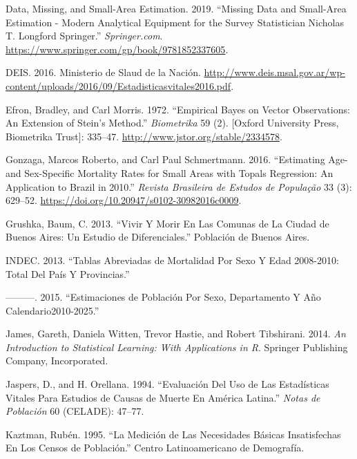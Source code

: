 \documentclass[12pt,]{article}
\begin{document}
\leavevmode\hypertarget{ref-Longford2005}{}%
Data, Missing, and Small-Area Estimation. 2019. ``Missing Data and
Small-Area Estimation - Modern Analytical Equipment for the Survey
Statistician \textbar{} Nicholas T. Longford \textbar{} Springer.''
\emph{Springer.com}.
\url{https://www.springer.com/gp/book/9781852337605}.

\leavevmode\hypertarget{ref-DEIS2016}{}%
DEIS. 2016. Ministerio de Slaud de la Nación.
\url{http://www.deis.msal.gov.ar/wp-content/uploads/2016/09/Estadisticasvitales2016.pdf}.

\leavevmode\hypertarget{ref-Efron1972}{}%
Efron, Bradley, and Carl Morris. 1972. ``Empirical Bayes on Vector
Observations: An Extension of Stein's Method.'' \emph{Biometrika} 59
(2). {[}Oxford University Press, Biometrika Trust{]}: 335--47.
\url{http://www.jstor.org/stable/2334578}.

\leavevmode\hypertarget{ref-Gonzaga_Schmertmann_2016}{}%
Gonzaga, Marcos Roberto, and Carl Paul Schmertmann. 2016. ``Estimating
Age- and Sex-Specific Mortality Rates for Small Areas with Topals
Regression: An Application to Brazil in 2010.'' \emph{Revista Brasileira
de Estudos de População} 33 (3): 629--52.
\url{https://doi.org/10.20947/s0102-30982016c0009}.

\leavevmode\hypertarget{ref-Grushka2013}{}%
Grushka, Baum, C. 2013. ``Vivir Y Morir En Las Comunas de La Ciudad de
Buenos Aires: Un Estudio de Diferenciales.'' Población de Buenos Aires.

\leavevmode\hypertarget{ref-INDEC2013}{}%
INDEC. 2013. ``Tablas Abreviadas de Mortalidad Por Sexo Y Edad
2008-2010: Total Del País Y Provincias.''

\leavevmode\hypertarget{ref-INDEC2015}{}%
---------. 2015. ``Estimaciones de Población Por Sexo, Departamento Y
Año Calendario2010-2025.''

\leavevmode\hypertarget{ref-James2014}{}%
James, Gareth, Daniela Witten, Trevor Hastie, and Robert Tibshirani.
2014. \emph{An Introduction to Statistical Learning: With Applications
in R}. Springer Publishing Company, Incorporated.

\leavevmode\hypertarget{ref-JaspersOrellana1994}{}%
Jaspers, D., and H. Orellana. 1994. ``Evaluación Del Uso de Las
Estadísticas Vitales Para Estudios de Causas de Muerte En América
Latina.'' \emph{Notas de Población} 60 (CELADE): 47--77.

\leavevmode\hypertarget{ref-Kaztman1995}{}%
Kaztman, Rubén. 1995. ``La Medición de Las Necesidades Básicas
Insatisfechas En Los Censos de Población.'' Centro Latinoamericano de
Demografía.
\end{document}

